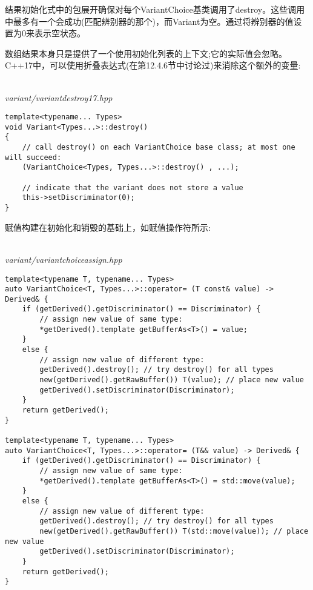 结果初始化式中的包展开确保对每个VariantChoice基类调用了destroy。这些调用中最多有一个会成功(匹配辨别器的那个)，而Variant为空。通过将辨别器的值设置为0来表示空状态。

数组结果本身只是提供了一个使用初始化列表的上下文;它的实际值会忽略。C++17中，可以使用折叠表达式(在第12.4.6节中讨论过)来消除这个额外的变量:

\hspace*{\fill} \\ %
\noindent
\textit{variant/variantdestroy17.hpp}
\begin{lstlisting}[style=styleCXX]
template<typename... Types>
void Variant<Types...>::destroy()
{
	// call destroy() on each VariantChoice base class; at most one will succeed:
	(VariantChoice<Types, Types...>::destroy() , ...);
	
	// indicate that the variant does not store a value
	this->setDiscriminator(0);
}
\end{lstlisting}



赋值构建在初始化和销毁的基础上，如赋值操作符所示:

\hspace*{\fill} \\ %
\noindent
\textit{variant/variantchoiceassign.hpp}
\begin{lstlisting}[style=styleCXX]
template<typename T, typename... Types>
auto VariantChoice<T, Types...>::operator= (T const& value) -> Derived& {
	if (getDerived().getDiscriminator() == Discriminator) {
		// assign new value of same type:
		*getDerived().template getBufferAs<T>() = value;
	}
	else {
		// assign new value of different type:
		getDerived().destroy(); // try destroy() for all types
		new(getDerived().getRawBuffer()) T(value); // place new value
		getDerived().setDiscriminator(Discriminator);
	}
	return getDerived();
}

template<typename T, typename... Types>
auto VariantChoice<T, Types...>::operator= (T&& value) -> Derived& {
	if (getDerived().getDiscriminator() == Discriminator) {
		// assign new value of same type:
		*getDerived().template getBufferAs<T>() = std::move(value);
	}
	else {
		// assign new value of different type:
		getDerived().destroy(); // try destroy() for all types
		new(getDerived().getRawBuffer()) T(std::move(value)); // place new value
		getDerived().setDiscriminator(Discriminator);
	}
	return getDerived();
}
\end{lstlisting}

